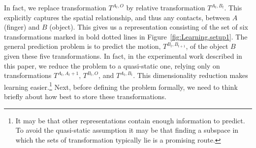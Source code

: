 In fact, we replace transformation $T^{A_t, O}$ by relative transformation $T^{A_t, B_t}$. This explicitly captures the spatial relationship, and thus any contacts, between $A$ (finger) and $B$ (object). This gives us a representation consisting of the set of six transformations marked in bold dotted lines in Figure~\ref{fig:Learning.setup1}. The general prediction problem is to predict the motion, $T^{B_t,B_{t+1}}$, of the object $B$ given these five transformations. In fact, in the experimental work described in this paper, we reduce the problem to a quasi-static one, relying only on transformations $T^{A_t,A_t+1}$, $T^{B_t,O}$, and $T^{A_t, B_t}$. This  dimensionality reduction makes learning easier.\footnote{It may be that other representations contain enough information to predict. To  avoid the quasi-static assumption it may be that finding a subspace in which the sets of transformation typically lie is a promising route.} Next, before defining the problem formally, we need to think briefly about how best to store these transformations.

